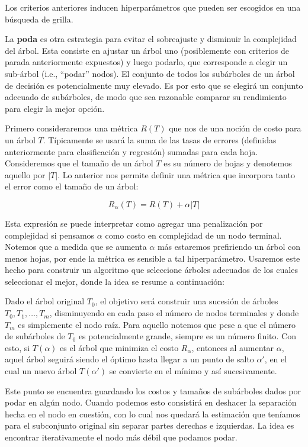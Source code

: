 Los criterios anteriores inducen hiperparámetros que pueden ser
escogidos en una búsqueda de grilla.

La \textbf{poda} es otra estrategia para evitar el sobreajuste y disminuir la complejidad del árbol. Esta consiste en ajustar un árbol uno (posiblemente con criterios de parada anteriormente expuestos) y luego podarlo, que corresponde a elegir un sub-árbol (i.e., “podar” nodos). El conjunto de todos los subárboles de un árbol de decisión es potencialmente muy elevado. Es por esto que se elegirá un conjunto adecuado de subárboles, de modo que sea razonable comparar su rendimiento para elegir la mejor opción.

Primero consideraremos una métrica $R(T)$ que nos de una noción de costo para un árbol $T$. Típicamente se usará la suma de las tasas de errores (definidas anteriormente para clasificación y regresión) sumadas para cada hoja. Consideremos que el tamaño de un árbol $T$ es su número de hojas y denotemos aquello por $|T|$. Lo anterior nos permite definir una métrica que incorpora tanto el error como el tamaño de un árbol:

\begin{equation}
    R_\alpha (T) = R(T) + \alpha |T|
\end{equation}

Esta expresión se puede interpretar como agregar una penalización por complejidad si pensamos $\alpha$ como costo en complejidad de un nodo terminal. Notemos que a medida que se aumenta $\alpha$ más estaremos prefiriendo un árbol con menos hojas, por ende la métrica es sensible a tal hiperparámetro. Usaremos este hecho para construir un algoritmo que seleccione árboles adecuados de los cuales seleccionar el mejor, donde la idea se resume a continuación:

Dado el árbol original $T_0$, el objetivo será construir una sucesión de árboles $T_0, T_1, \dots, T_m$, disminuyendo en cada paso el número de nodos terminales y donde $T_m$ es simplemente el nodo raíz. Para aquello notemos que pese a que el número de subárboles de $T_0$ es potencialmente grande, siempre es un número finito. Con esto, si $T(\alpha)$ es el árbol que minimiza el costo $R_\alpha$, entonces al aumentar $\alpha$, aquel árbol seguirá siendo el óptimo hasta llegar a un punto de salto $\alpha'$, en el cual un nuevo árbol $T(\alpha')$ se convierte en el mínimo y así sucesivamente.

Este punto se encuentra guardando los costos y tamaños de subárboles dados por podar en algún nodo. Cuando podemos esto consistirá en deshacer la separación hecha en el nodo en cuestión, con lo cual nos quedará la estimación que teníamos para el subconjunto original sin separar partes derechas e izquierdas. La idea es encontrar iterativamente el nodo más débil que podamos podar.

